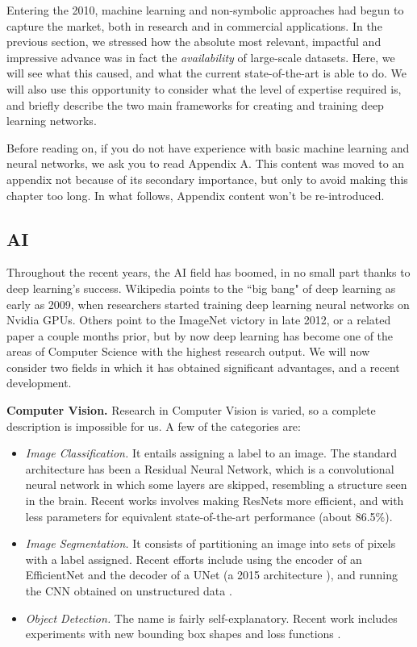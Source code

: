 \documentclass[../main.tex]{subfiles}
\begin{document}
Entering the 2010, machine learning and non-symbolic approaches had begun to capture the market, both in research and in commercial applications. In the previous section, we stressed how the absolute most relevant, impactful and impressive advance was in fact the \textit{availability} of large-scale datasets. Here, we will see what this caused, and what the current state-of-the-art is able to do. We will also use this opportunity to consider what the level of expertise required is, and briefly describe the two main frameworks for creating and training deep learning networks.

Before reading on, if you do not have experience with basic machine learning and neural networks, we ask you to read Appendix A. This content was moved to an appendix not because of its secondary importance, but only to avoid making this chapter too long. In what follows, Appendix content won't be re-introduced.

\subsection{AI}
Throughout the recent years, the AI field has boomed, in no small part thanks to deep learning's success. Wikipedia points to the ``big bang" of deep learning as early as 2009, when researchers started training deep learning neural networks on Nvidia GPUs. Others\cite{parloffWhyDeepLearning2016} point to the ImageNet victory in late 2012, or a related paper a couple months prior\cite{ciresanMulticolumnDeepNeural2012}, but by now deep learning has become one of the areas of Computer Science with the highest research output. We will now consider two fields in which it has obtained significant advantages, and a recent development.

\vspace{4pt}
\textbf{Computer Vision.} Research in Computer Vision is varied, so a complete description is impossible for us. A few of the categories are:
\begin{itemize}
    \item \textit{Image Classification.} It entails assigning a label to an image. The standard architecture has been a Residual Neural Network, which is a convolutional neural network in which some layers are skipped, resembling a structure seen in the brain. Recent works involves making ResNets more efficient, and with less parameters for equivalent state-of-the-art performance (about 86.5\%)\cite{tanEfficientNetV2SmallerModels2021}\cite{brockHighPerformanceLargeScaleImage2021}.
    \item \textit{Image Segmentation.} It consists of partitioning an image into sets of pixels with a label assigned. Recent efforts include using the encoder of an EfficientNet and the decoder of a UNet (a 2015 architecture \cite{ronnebergerUNetConvolutionalNetworks2015}), and running the CNN obtained on unstructured data \cite{bahetiEffUNetNovelArchitecture2020}.
    \item \textit{Object Detection.} The name is fairly self-explanatory. Recent work includes experiments with new bounding box shapes and loss functions \cite{zhangVarifocalNetIoUawareDense2020}.
\end{itemize}
\end{document}
